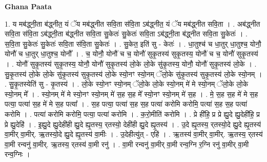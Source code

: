 \documentclass[17pt]{extarticle}
\begin{document}
\textbf{Ghana Paata } \newline

1. य मब॑द्ध्नी॒ता ब॑द्ध्नीत॒ यं ॅय मब॑द्ध्नीत सवि॒ता स॑वि॒ता ऽब॑द्ध्नीत॒ यं ॅय मब॑द्ध्नीत सवि॒ता । . अब॑द्ध्नीत सवि॒ता स॑वि॒ता ऽब॑द्ध्नी॒ता ब॑द्ध्नीत सवि॒ता सु॒केतः॑ सु॒केतः॑ सवि॒ता ऽब॑द्ध्नी॒ता ब॑द्ध्नीत सवि॒ता सु॒केतः॑ । . स॒वि॒ता सु॒केतः॑ सु॒केतः॑ सवि॒ता स॑वि॒ता सु॒केतः॑ । . सु॒केत॒ इति॑ सु - केतः॑ । . धा॒तुश्च॑ च धा॒तुर् धा॒तुश्च॒ योनौ॒ योनौ॑ च धा॒तुर् धा॒तुश्च॒ योनौ᳚ । . च॒ योनौ॒ योनौ॑ च च॒ योनौ॑ सुकृ॒तस्य॑ सुकृ॒तस्य॒ योनौ॑ च च॒ योनौ॑ सुकृ॒तस्य॑ । . योनौ॑ सुकृ॒तस्य॑ सुकृ॒तस्य॒ योनौ॒ योनौ॑ सुकृ॒तस्य॑ लो॒के लो॒के सु॑कृ॒तस्य॒ योनौ॒ योनौ॑ सुकृ॒तस्य॑ लो॒के । . सु॒कृ॒तस्य॑ लो॒के लो॒के सु॑कृ॒तस्य॑ सुकृ॒तस्य॑ लो॒के स्यो॒नꣳ स्यो॒नम् ॅलो॒के सु॑कृ॒तस्य॑ सुकृ॒तस्य॑ लो॒के स्यो॒नम् । . सु॒कृ॒तस्येति॑ सु - कृ॒तस्य॑ । . लो॒के स्यो॒नꣳ स्यो॒नम् ॅलो॒के लो॒के स्यो॒नम् मे॑ मे स्यो॒नम् ॅलो॒के लो॒के स्यो॒नम् मे᳚ । . स्यो॒नम् मे॑ मे स्यो॒नꣳ स्यो॒नम् मे॑ स॒ह स॒ह मे᳚ स्यो॒नꣳ स्यो॒नम् मे॑ स॒ह । . मे॒ स॒ह स॒ह मे॑ मे स॒ह पत्या॒ पत्या॑ स॒ह मे॑ मे स॒ह पत्या᳚ । . स॒ह पत्या॒ पत्या॑ स॒ह स॒ह पत्या॑ करोमि करोमि॒ पत्या॑ स॒ह स॒ह पत्या॑ करोमि । . पत्या॑ करोमि करोमि॒ पत्या॒ पत्या॑ करोमि । . क॒रो॒मीति॑ करोमि । . प्रे ही॑हि॒ प्र प्रे ह्यु॒दे ह्यु॒देही॑हि॒ प्र प्रे ह्यु॒देहि॑ । . इ॒ह्यु॒दे ह्यु॒देही॑ही ह्यु॒दे ह्यृ॒तस्य॒ र्‌तस्यो॒ देही॑ही ह्यु॒दे ह्यृ॒तस्य॑ । . उ॒दे ह्यृ॒तस्य॒ र्‌तस्यो॒दे ह्यु॒दे ह्यृ॒तस्य॑ वा॒मीर् वा॒मीर्. ऋ॒तस्यो॒दे ह्यु॒दे ह्यृ॒तस्य॑ वा॒मीः । . उ॒देहीत्यु॑त् - एहि॑ । . ऋ॒तस्य॑ वा॒मीर् वा॒मीर्. ऋ॒तस्य॒ र्‌तस्य॑ वा॒मी रन्वनु॑ वा॒मीर्. ऋ॒तस्य॒ र्‌तस्य॑ वा॒मी रनु॑ । . वा॒मी रन्वनु॑ वा॒मीर् वा॒मी रन्व॒ग्नि र॒ग्नि रनु॑ वा॒मीर् वा॒मी रन्व॒ग्निः । \newline
\end{document}
